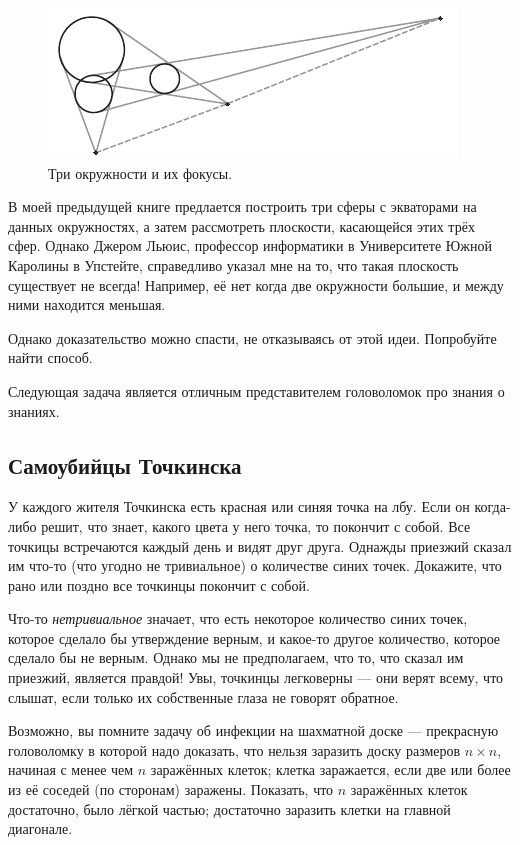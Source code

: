 \begin{figure}[h!]
\centering
\includegraphics[scale=1]{pics/3circs}
\caption{Три окружности и их фокусы.}
\label{pic:3circ}
\end{figure}

В моей предыдущей книге \cite{59} предлается построить три сферы с экваторами на данных окружностях, а затем рассмотреть плоскости, касающейся этих трёх сфер.
Однако Джером Льюис, профессор информатики в Университете Южной Каролины в Упстейте, справедливо указал мне на то, что такая плоскость существует не всегда!
Например, её нет когда две окружности большие, и между ними находится меньшая.

Однако доказательство можно спасти, не отказываясь от этой идеи.
Попробуйте найти способ.

\medskip

Следующая задача является отличным представителем головоломок про знания о знаниях.

\subsection*{Самоубийцы Точкинска}

У каждого жителя Точкинска есть красная или синяя точка на лбу.
Если он когда-либо решит, что знает, какого цвета у него точка, то покончит с собой.
Все точкицы встречаются каждый день и видят друг друга.
Однажды приезжий сказал им что-то (что угодно не тривиальное) о количестве синих точек.
Докажите, что рано или поздно все точкинцы покончит с собой.

 Что-то \emph{нетривиальное} значает, что есть некоторое количество синих точек, которое сделало бы утверждение верным, и какое-то другое количество, которое сделало бы не верным.
Однако мы не предполагаем, что то, что сказал им приезжий, является правдой!
Увы, точкинцы легковерны --- они верят всему, что слышат, если только их собственные глаза не говорят обратное.

\medskip

Возможно, вы помните задачу об инфекции на шахматной доске --- прекрасную головоломку в которой надо доказать, что нельзя заразить доску размеров $n \times n$, начиная с менее чем $n$ заражённых клеток;
клетка заражается, если две или более из её соседей (по сторонам) заражены.
Показать, что $n$ заражённых клеток достаточно, было лёгкой частью; достаточно заразить клетки на главной диагонале.

